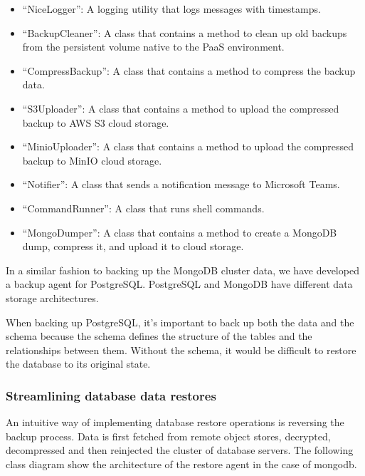 \begin{itemize}[label={--}]
\item “NiceLogger”: A logging utility that logs messages with timestamps. 
\item “BackupCleaner”: A class that contains a method to clean up old backups from the persistent volume native to the PaaS environment. 
\item  “CompressBackup”: A class that contains a method to compress the backup  data. 
\item  “S3Uploader”: A class that contains a method to upload the compressed backup to AWS S3 cloud storage. 
\item “MinioUploader”: A class that contains a method to upload the compressed backup to MinIO cloud storage. 
\item  “Notifier”: A class that sends a notification message to Microsoft Teams. 
\item  “CommandRunner”: A class that runs shell commands. 
\item “MongoDumper”: A class that contains a method to create a MongoDB dump, compress it, and upload it to cloud storage. 
\end{itemize}
 
\hspace{7mm}In a similar fashion to backing up the MongoDB cluster data, we have developed a backup agent for PostgreSQL. PostgreSQL and MongoDB have different data storage architectures.  

\hspace{7mm}When backing up PostgreSQL, it's important to back up both the data and the schema because the schema defines the structure of the tables and the relationships between them. Without the schema, it would be difficult to restore the database to its original state.

\subsubsection{Streamlining database data restores}

\hspace{7mm}An intuitive way of implementing database restore operations is reversing the backup process. Data is first fetched from remote object stores, decrypted, decompressed and then reinjected the cluster of database servers. The following class diagram show the architecture of the restore agent in the case of mongodb.

